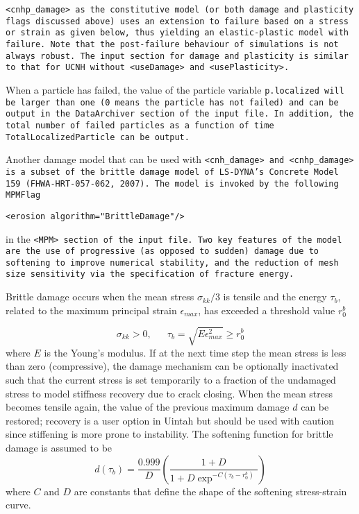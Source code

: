 \begin{enumerate}
\tt <cnhp\_damage> \normalfont as the constitutive model (or both damage and plasticity
 flags discussed above) uses an extension
to failure based on a stress or strain as given below, thus yielding an
elastic-plastic model with failure.  Note that the post-failure behaviour of
simulations is not always robust.  The input section for damage and plasticity is
similar to that for UCNH without \tt <useDamage> \normalfont and \tt <usePlasticity>. \normalfont

When a particle has failed, the value of the particle variable \tt p.localized \normalfont
will be larger than one (0 means the particle has not failed) and can be output in the \tt DataArchiver
\normalfont section of the input file. In addition, the total number of failed particles as
a function of time \tt TotalLocalizedParticle \normalfont can be output. 

Another damage model that can be used with \tt <cnh\_damage> \normalfont and
\tt <cnhp\_damage> \normalfont is a subset of the brittle damage model of LS-DYNA's Concrete
 Model 159 (FHWA-HRT-057-062, 2007). The model is invoked by the following MPMFlag
\begin{Verbatim}[fontsize=\footnotesize]
     <erosion algorithm="BrittleDamage"/>
\end{Verbatim}
in the \tt <MPM> \normalfont section of the input file. Two key features of the model are the use of
progressive (as opposed to sudden) damage due to softening to improve numerical stability, 
and the reduction of mesh size sensitivity via the specification of fracture energy. 

Brittle damage occurs when the mean stress $\sigma_{kk}/3$ is tensile
and the energy $\tau_b$, related to the maximum principal 
strain $\epsilon_{max}$, has exceeded a threshold value $r_0^b$

\begin{equation}
\sigma_{kk}>0, \phantom{ijkl}
\tau_b = \sqrt{E \epsilon_{max}^2} \geq r_0^b
\end{equation}
where $E$ is the Young's modulus. If at the next time step the mean stress is less than
zero (compressive), the damage mechanism can be optionally inactivated such that the current stress 
is set temporarily to a fraction of the undamaged stress to 
model stiffness recovery due to crack closing. When the mean stress becomes tensile again,
the value of the previous maximum damage $d$ can be restored; recovery is a user option in Uintah
but should be used with caution since stiffening is more prone to instability.
The softening function for brittle damage is assumed to be
\begin{equation}
d(\tau_b)= \frac{0.999}{D} \left(\frac{1+D}{1+D \exp^{-C(\tau_b-r_0^b)}} \right)
\end{equation}
where $C$ and $D$ are constants that define the shape of the softening
stress-strain curve.
  

\end{enumerate}
